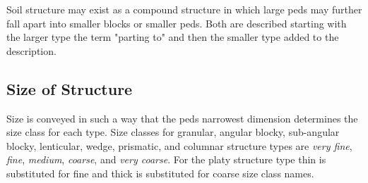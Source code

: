 \documentclass[a5paper]{book}
\begin{document}
Soil structure may exist as a compound structure in which large peds may further fall apart into smaller blocks or smaller peds. Both are described starting with the larger type the term "parting to" and then the smaller type added to the description.
    
\subsection{Size of Structure}
    
Size is conveyed in such a way that the peds narrowest dimension  determines the size class for each type. Size classes for granular, angular blocky, sub-angular blocky, lenticular, wedge, prismatic, and columnar structure types are \emph{very fine}, \emph{fine}, \emph{medium}, \emph{coarse}, and \emph{very coarse}. For the platy structure type thin is substituted for fine and thick is substituted for coarse size class names.

\end{document}
